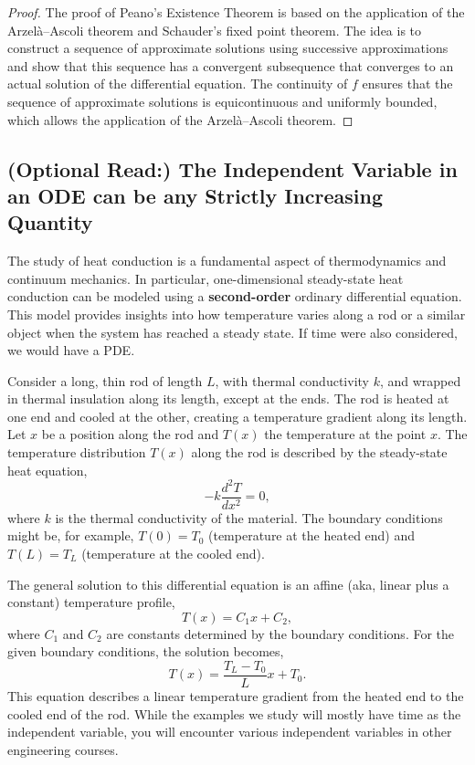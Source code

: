 \begin{proof}
The proof of Peano's Existence Theorem is based on the application of the Arzelà–Ascoli theorem and Schauder's fixed point theorem. The idea is to construct a sequence of approximate solutions using successive approximations and show that this sequence has a convergent subsequence that converges to an actual solution of the differential equation. The continuity of \( f \) ensures that the sequence of approximate solutions is equicontinuous and uniformly bounded, which allows the application of the Arzelà–Ascoli theorem.
\end{proof}


\subsection{(Optional Read:) The Independent Variable in an ODE can be any Strictly Increasing Quantity}

The study of heat conduction is a fundamental aspect of thermodynamics and continuum mechanics. In particular, one-dimensional steady-state heat conduction can be modeled using a \textbf{second-order} ordinary differential equation. This model provides insights into how temperature varies along a rod or a similar object when the system has reached a steady state. If time were also considered, we would have a PDE.

Consider a long, thin rod of length \( L \), with thermal conductivity \( k \), and wrapped in thermal insulation along its length, except at the ends. The rod is heated at one end and cooled at the other, creating a temperature gradient along its length. Let $x$ be a position along the rod and $T(x)$ the temperature at the point $x$. The temperature distribution \( T(x) \) along the rod is described by the steady-state heat equation,
\begin{equation}
    -k \frac{d^2T}{dx^2} = 0,
\end{equation}
where \( k \) is the thermal conductivity of the material. The boundary conditions might be, for example, \( T(0) = T_0 \) (temperature at the heated end) and \( T(L) = T_L \) (temperature at the cooled end). 

The general solution to this differential equation is an affine (aka, linear plus a constant) temperature profile,
\begin{equation}
    T(x) = C_1 x + C_2,
\end{equation}
where \( C_1 \) and \( C_2 \) are constants determined by the boundary conditions. For the given boundary conditions, the solution becomes,
\begin{equation}
    T(x) = \frac{T_L - T_0}{L}x + T_0.
\end{equation}
This equation describes a linear temperature gradient from the heated end to the cooled end of the rod. While the examples we study will mostly have time as the independent variable, you will encounter various independent variables in other engineering courses. 


